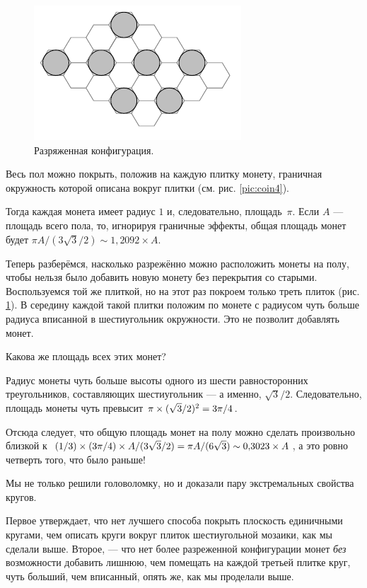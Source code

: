 \begin{figure}[b!]
\centering
\includegraphics[scale=1]{pics/coin5}
\caption{Разряженная конфигурация.}
\label{pic:coin5}
\end{figure}

Весь пол можно покрыть, положив на каждую плитку монету, граничная окружность которой описана вокруг плитки (см. рис. \ref{pic:coin4}).

Тогда каждая монета имеет радиус $1$ и, следовательно, площадь~$\pi$.
Если $A$ --- площадь всего пола, то, игнорируя граничные эффекты, общая площадь монет будет $\pi A/(3\sqrt{3}/2)\sim 1{,}2092\times A$.

Теперь разберёмся, насколько разрежённо можно расположить монеты на полу, чтобы нельзя было добавить новую монету без перекрытия со старыми.
Воспользуемся той же плиткой, но на этот раз покроем только треть плиток (рис. \ref{pic:coin5}).
В середину каждой такой плитки положим по монете с радиусом чуть больше радиуса вписанной в шестиугольник окружности. 
Это не позволит добавлять монет.

Какова же площадь всех этих монет?

Радиус монеты чуть больше высоты одного из шести равносторонних треугольников, составляющих шестиугольник — а именно, $\sqrt{3}/2$.
Следовательно, площадь монеты чуть превысит $\pi \z\times (\sqrt{3}/2)^2 \z= 3\pi/4$.

Отсюда следует, что общую площадь монет на полу можно сделать произвольно близкой к $(1/3) \times (3\pi/4) \times A/(3\sqrt{3}/2) = \pi A/(6 \sqrt{3}) \z\sim 0{,}3023 \times A$, а это ровно четверть того, что было раньше!

\medskip

Мы не только решили головоломку, но и доказали пару экстремальных свойства кругов.

Первое утверждает, что нет лучшего способа покрыть плоскость единичными кругами, чем описать круги вокруг плиток шестиугольной мозаики, как мы сделали выше.
Второе, --- что нет более разреженной конфигурации монет \emph{без} возможности добавить лишнюю, чем помещать на каждой третьей плитке круг, чуть больший, чем вписанный, опять же, как мы проделали выше.

